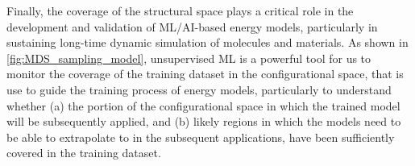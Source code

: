 Finally, the coverage of the structural space plays a critical role in the development and validation of ML/AI-based energy models,\cite{fu2022forces,yang2026mace} particularly in sustaining long-time dynamic simulation of molecules and materials. As shown in \cref{fig:MDS_sampling_model}, unsupervised ML is a powerful tool for us to monitor the coverage of the training dataset in the configurational space, that is use to guide the training process of energy models, particularly to understand whether (a) the portion of the configurational space in which the trained model will be subsequently applied, and (b) likely regions in which the models need to be able to extrapolate to in the subsequent applications, have been sufficiently covered in the training dataset.

